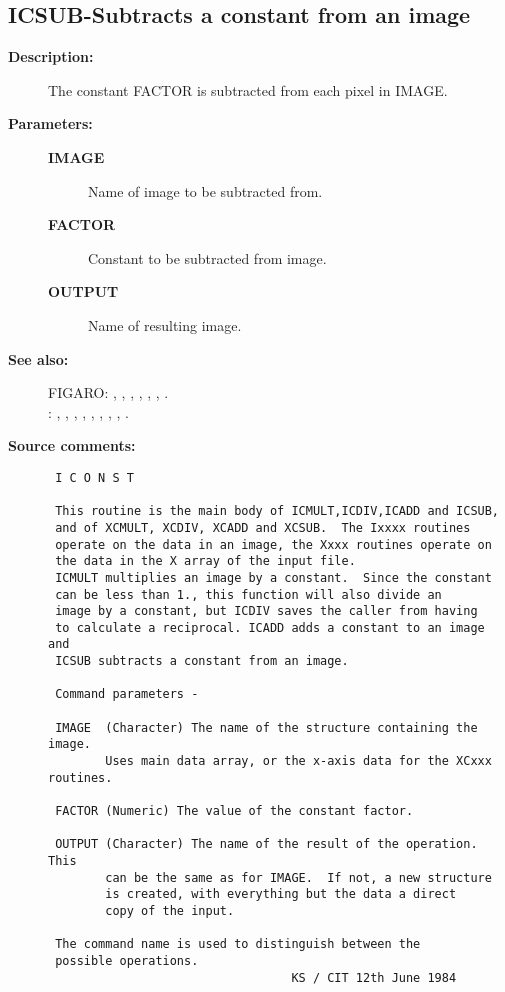 \subsection{ICSUB-\label{ICSUB}Subtracts a constant from an image}
\begin{description}

\item [{\bf Description:}]
 The constant FACTOR is subtracted from each pixel
 in IMAGE.

\item [{\bf Parameters:}]
\begin{description}
\item [{\bf IMAGE}]
 Name of image to be subtracted from.
\item [{\bf FACTOR}]
 Constant to be subtracted from image.
\item [{\bf OUTPUT}]
 Name of resulting image.
\end{description}

\item [{\bf See also:}]
FIGARO: , , , , , , .\\
: , , , , , , , , .\\

\item [{\bf Source comments:}]
\begin{verbatim}
 I C O N S T

 This routine is the main body of ICMULT,ICDIV,ICADD and ICSUB,
 and of XCMULT, XCDIV, XCADD and XCSUB.  The Ixxxx routines
 operate on the data in an image, the Xxxx routines operate on
 the data in the X array of the input file.
 ICMULT multiplies an image by a constant.  Since the constant
 can be less than 1., this function will also divide an
 image by a constant, but ICDIV saves the caller from having
 to calculate a reciprocal. ICADD adds a constant to an image and
 ICSUB subtracts a constant from an image.

 Command parameters -

 IMAGE  (Character) The name of the structure containing the image.
        Uses main data array, or the x-axis data for the XCxxx routines.

 FACTOR (Numeric) The value of the constant factor.

 OUTPUT (Character) The name of the result of the operation.  This
        can be the same as for IMAGE.  If not, a new structure
        is created, with everything but the data a direct
        copy of the input.

 The command name is used to distinguish between the
 possible operations.
                                  KS / CIT 12th June 1984
\end{verbatim}
\end{description}
